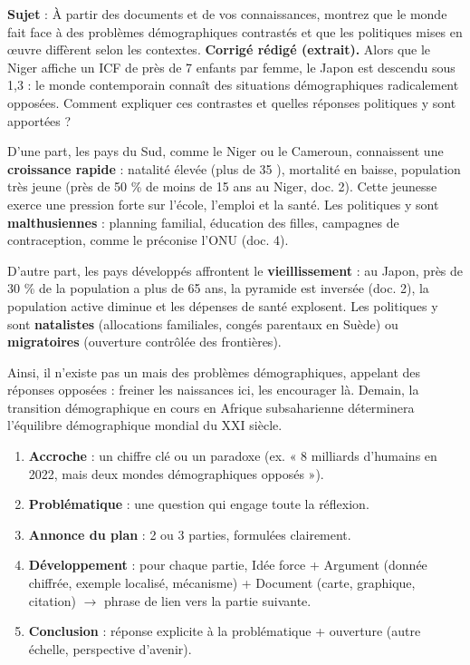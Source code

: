 \documentclass[11pt]{article}
\newcounter{popsec}
\newcounter{popsub}
\newcommand{\courssub}[1]{%
  \stepcounter{popsub}%
  \par\vspace{9pt}\noindent{\popxbold\fontsize{11.5}{13}\selectfont\color{popink}{\color{poporange}\thepopsec.\thepopsub}\hspace{6pt}#1}\par\nopagebreak\vspace{4pt}
}
\begin{document}
\begin{exoresolu}
\textbf{Sujet} : À partir des documents et de vos connaissances, montrez que le monde fait face à des problèmes démographiques contrastés et que les politiques mises en œuvre diffèrent selon les contextes.
\tcblower
\textbf{Corrigé rédigé (extrait).} Alors que le Niger affiche un ICF de près de 7 enfants par femme, le Japon est descendu sous 1,3 : le monde contemporain connaît des situations démographiques radicalement opposées. Comment expliquer ces contrastes et quelles réponses politiques y sont apportées ?

D'une part, les pays du Sud, comme le Niger ou le Cameroun, connaissent une \textbf{croissance rapide} : natalité élevée (plus de 35 \textperthousand), mortalité en baisse, population très jeune (près de 50 \% de moins de 15 ans au Niger, doc. 2). Cette jeunesse exerce une pression forte sur l'école, l'emploi et la santé. Les politiques y sont \textbf{malthusiennes} : planning familial, éducation des filles, campagnes de contraception, comme le préconise l'ONU (doc. 4).

D'autre part, les pays développés affrontent le \textbf{vieillissement} : au Japon, près de 30 \% de la population a plus de 65 ans, la pyramide est inversée (doc. 2), la population active diminue et les dépenses de santé explosent. Les politiques y sont \textbf{natalistes} (allocations familiales, congés parentaux en Suède) ou \textbf{migratoires} (ouverture contrôlée des frontières).

Ainsi, il n'existe pas un mais des problèmes démographiques, appelant des réponses opposées : freiner les naissances ici, les encourager là. Demain, la transition démographique en cours en Afrique subsaharienne déterminera l'équilibre démographique mondial du XXI siècle.
\end{exoresolu}

\courssub{Méthode : la démonstration géographique}

\begin{methode}
\begin{enumerate}
\item \textbf{Accroche} : un chiffre clé ou un paradoxe (ex. « 8 milliards d'humains en 2022, mais deux mondes démographiques opposés »).
\item \textbf{Problématique} : une question qui engage toute la réflexion.
\item \textbf{Annonce du plan} : 2 ou 3 parties, formulées clairement.
\item \textbf{Développement} : pour chaque partie, Idée force + Argument (donnée chiffrée, exemple localisé, mécanisme) + Document (carte, graphique, citation) $\rightarrow$ phrase de lien vers la partie suivante.
\item \textbf{Conclusion} : réponse explicite à la problématique + ouverture (autre échelle, perspective d'avenir).
\end{enumerate}
\end{methode}
\end{document}
